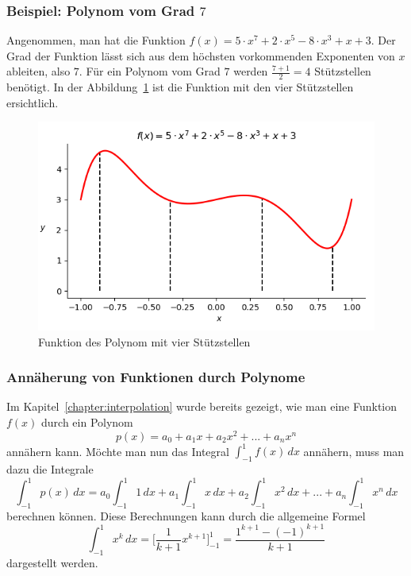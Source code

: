 \subsubsection{Beispiel: Polynom vom Grad $7$}
Angenommen, man hat die Funktion $f(x) = 5 \cdot x^{7} + 2 \cdot x^{5} - 8 \cdot x^{3} + x + 3$.
Der Grad der Funktion lässt sich aus dem höchsten vorkommenden Exponenten von $x$ ableiten,
also $7$.
Für ein Polynom vom Grad $7$ werden $\frac{7+1}{2} = 4$ Stützstellen benötigt.
In der Abbildung~\ref{quadratur:figure:polynom} ist die Funktion mit den vier 
Stützstellen ersichtlich.
\begin{figure}
    \centering
    \includegraphics[scale=0.7]{papers/quadratur/figures/polynom.png}
    \caption{ Funktion des Polynom mit vier Stützstellen
    \label{quadratur:figure:polynom}}
\end{figure}

\subsubsection{Annäherung von Funktionen durch Polynome}
Im Kapitel~\ref{chapter:interpolation} wurde bereits gezeigt, 
wie man eine Funktion $f(x)$ durch ein Polynom 
\begin{equation}
    p(x) = a_{0} + a_{1}x + a_{2}x^{2} + ... + a_{n}x^{n}
\end{equation}
annähern kann. Möchte man nun das Integral $\int_{-1}^{1} f(x) \, dx$ annähern, 
muss man dazu die Integrale 
\begin{equation}
    \int_{-1}^{1} p(x)\,dx 
    =
    a_{0} \int_{-1}^{1} 1\,dx
    +
    a_{1}\int_{-1}^{1} x\,dx 
    + 
    a_{2}\int_{-1}^{1} x^{2} \,dx  
    +
    ... 
    +
    a_{n}\int_{-1}^{1} x^{n}\,dx 
\end{equation}
berechnen können. Diese Berechnungen kann durch die allgemeine Formel
\begin{equation}
    \int_{-1}^{1} x^{k}\,dx 
    = 
    \bigg[\frac{1}{k+1} x^{k+1}\bigg]_{-1}^{1}
    =
    \frac{1^{k+1} - (-1)^{k+1}}{k+1}  
\end{equation}
dargestellt werden.

